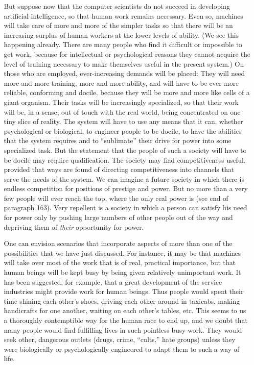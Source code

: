  But suppose now that the computer scientists do not succeed in developing artificial intelligence, so that human work remains necessary. Even so, machines will take care of more and more of the simpler tasks so that there will be an increasing surplus of human workers at the lower levels of ability. (We see this happening already. There are many people who find it difficult or impossible to get work, because for intellectual or psychological reasons they cannot acquire the level of training necessary to make themselves useful in the present system.) On those who are employed, ever-increasing demands will be placed: They will need more and more training, more and more ability, and will have to be ever more reliable, conforming and docile, because they will be more and more like cells of a giant organism. Their tasks will be increasingly specialized, so that their work will be, in a sense, out of touch with the real world, being concentrated on one tiny slice of reality. The system will have to use any means that it can, whether psychological or biological, to engineer people to be docile, to have the abilities that the system requires and to “sublimate” their drive for power into some specialized task. But the statement that the people of such a society will have to be docile may require qualification. The society may find competitiveness useful, provided that ways are found of directing competitiveness into channels that serve the needs of the system. We can imagine a future society in which there is endless competition for positions of prestige and power. But no more than a very few people will ever reach the top, where the only real power is (see end of paragraph 163). Very repellent is a society in which a person can satisfy his need for power only by pushing large numbers of other people out of the way and depriving them of {\em their} opportunity for power.

 One can envision scenarios that incorporate aspects of more than one of the possibilities that we have just discussed. For instance, it may be that machines will take over most of the work that is of real, practical importance, but that human beings will be kept busy by being given relatively unimportant work. It has been suggested, for example, that a great development of the service industries might provide work for human beings. Thus people would spent their time shining each other’s shoes, driving each other around in taxicabs, making handicrafts for one another, waiting on each other’s tables, etc. This seems to us a thoroughly contemptible way for the human race to end up, and we doubt that many people would find fulfilling lives in such pointless busy-work. They would seek other, dangerous outlets (drugs, crime, “cults,” hate groups) unless they were biologically or psychologically engineered to adapt them to such a way of life.


